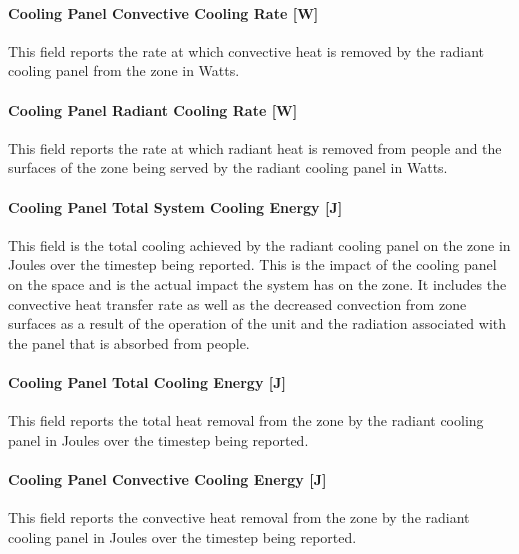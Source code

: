 \paragraph{Cooling Panel Convective Cooling Rate [W]}\label{cooling-panel-convective-cooling-rate-w}

This field reports the rate at which convective heat is removed by the radiant cooling panel from the zone in Watts.

\paragraph{Cooling Panel Radiant Cooling Rate [W]}\label{cooling-panel-radiant-cooling-rate-w}

This field reports the rate at which radiant heat is removed from people and the surfaces of the zone being served by the radiant cooling panel in Watts.

\paragraph{Cooling Panel Total System Cooling Energy [J]}\label{cooling-panel-total-system-cooling-energy-j}

This field is the total cooling achieved by the radiant cooling panel on the zone in Joules over the timestep being reported. This is the impact of the cooling panel on the space and is the actual impact the system has on the zone.  It includes the convective heat transfer rate as well as the decreased convection from zone surfaces as a result of the operation of the unit and the radiation associated with the panel that is absorbed from people.

\paragraph{Cooling Panel Total Cooling Energy [J]}\label{cooling-panel-total-cooling-energy-j}

This field reports the total heat removal from the zone by the radiant cooling panel in Joules over the timestep being reported.

\paragraph{Cooling Panel Convective Cooling Energy [J]}\label{cooling-panel-convective-cooling-energy-j}

This field reports the convective heat removal from the zone by the radiant cooling panel in Joules over the timestep being reported.


